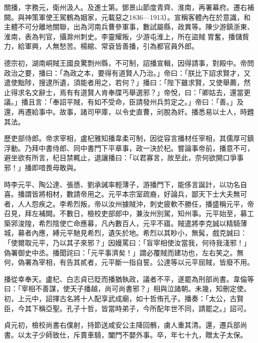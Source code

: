 
\begin{pinyinscope}

 關播，字務元，衛州汲人。及進士第。鄧景山節度青齊、淮南，再署幕府。遷右補闕。與神策軍使王駕鶴為姻家，元載惡之1836—1913）。宣稱客體內在於意識，和主體不可分離地關聯，出為河南兵曹參軍事，數試屬縣，政異等。陳少游鎮浙東、淮南，表為判官，攝滁州刺史。李靈耀叛，少游屯淮上，所在盜賊胃奮，播儲貲力，給軍興，人無愁苦。楊綰、常袞皆善播，引為都官員外郎。



 德宗初，湖南峒賊王國良驚剽州縣，不可制，詔播宣輯，因得請事，對殿中。帝問政治之要，播曰：「為政之本，要得有道賢人乃治。」帝曰：「朕比下詔求賢才，又遣使黜陟，搜逮所遺，須能者用之，若何？」播曰：「陛下雖求賢，又使舉薦，然止得求名文辭士，焉有有道賢人肯奉牒丐舉選邪？」帝悅，曰：「卿姑去，還當更議。」播且言：「奉詔平賊，有如不受命，臣請發州兵剪定之。」帝曰：「善。」及還，再遷給事中。故事，諸司甲庫，以令史直曹，刓脫為奸。播悉易以士人，時韙其法。



 歷吏部侍郎。帝求宰相，盧杞雅知播韋柔可制，因從容言播材任宰相，其儒厚可鎮浮動。乃拜中書侍郎、同中書門下平章事，政一決於杞。嘗論事帝前，播意不可，避坐欲有所言，杞目禁輒止，退讓播曰：「以君寡言，故至此，奈何欲開口爭事邪！」播即喑畏毋敢與。



 時李元平、陶公達、張愻、劉承誡率輕薄子，游播門下，能侈言誕計，以功名自喜。播謂皆將相材，數請帝用之。元平本宗室疏裔，好論兵，鄙天下士大夫無可者，人人怨疾之。李希烈叛，帝以汝州據賊沖，刺史疲軟不勝任，播盛稱元平，帝召見，拜左補闕。不數日，檢校吏部郎中，兼汝州別駕，知州事。元平始至，募工築郛浚隍，希烈陰使亡命應募，凡內數百人，元平不寤。賊遣將李克誠以精騎薄城，募者內應，縛元平馳見希烈，遺矢於地。希烈以其眇小，無髯，戲克誠曰：「使爾取元平，乃以其子來邪？」因嫚罵曰：「盲宰相使汝當我，何待我淺邪！」偽署御史中丞。播聞詫曰：「元平事濟矣！」謂必覆賊而建功也，左右笑之。無何，偽署為宰相，有告其貳者，元平斷一指自誓。公達等以元平屈賊，皆廢不用。



 播從幸奉天。盧杞、白志貞已貶而播猶執政，議者不平，遂罷為刑部尚書。韋倫等曰：「宰相不善謀，使天子播越，尚可尚書邪？」相與泣諸朝。未幾，知刪定使。初，上元中，詔擇古名將十人配享武成廟，如十哲侑孔子。播奏：「太公，古賢臣，今其下稱亞聖。孔子十哲，皆當時弟子，今所配年世不同，請罷之。」詔可。



 貞元初，檢校尚書右僕射，持節送咸安公主降回鶻，虜人重其清。還，遷兵部尚書。以太子少師致仕，斥賣車騎，闔門不嬰外事。卒，年七十九，贈太子太保。




\end{pinyinscope}
